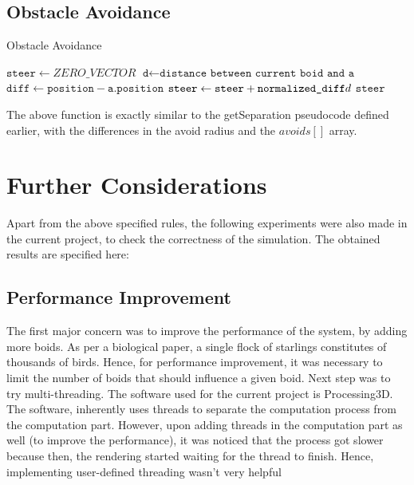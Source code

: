 \documentclass[12pt]{report}
\newcommand{\vars}{\texttt}
\let\oldReturn\Return
\renewcommand{\Return}{\State\oldReturn}
\begin{document}
\subsection*{Obstacle Avoidance}
\begin{algorithm}
\caption{Obstacle Avoidance}\label{obstacle}
\begin{algorithmic}[1]
	\State $\vars{steer} \gets ZERO\_VECTOR$
    	\State $\vars{d} \gets \texttt{distance between current boid and a}$
		\If{$\vars{d} > 0$ AND $\vars{d} < d_{avoid}$}
        \State $\vars{diff} \gets \vars{position}-\vars{a.position}$
        \State $\vars{steer} \gets \vars{steer}+\vars{normalized\_diff}\/d $
        \EndIf
	\EndFor
    \Return $\vars{steer}$
\EndFunction
\end{algorithmic}
\end{algorithm}
The above function is exactly similar to the getSeparation pseudocode defined earlier, with the differences in the avoid radius and the $avoids[]$ array.

\newpage
\section*{Further Considerations}
Apart from the above specified rules, the following experiments were also made in the current project, to check the correctness of the simulation. The obtained results are specified here:

\subsection*{Performance Improvement}
The  first major concern was to improve the performance of the system, by adding more boids. As per a biological paper, a single flock of starlings constitutes of thousands of birds. Hence, for performance improvement, it was necessary to limit the number of boids that should influence a given boid. 
\newline
Next step was to try multi-threading. The software used for the current project is Processing3D. The software, inherently uses threads to separate the computation process from the computation part. However, upon adding threads in the computation part as well (to improve the performance), it was noticed that the process got slower because then, the rendering started waiting for the thread to finish. Hence, implementing user-defined threading wasn't very helpful
\end{document}
